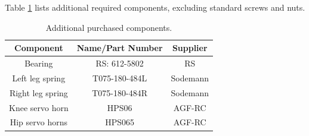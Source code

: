 Table \ref{tab:other_purchased_components} lists additional required components, excluding standard screws and nuts.

\begin{table}[h!]
    \centering
    \begin{tabular}{|c|c|c|}
        \hline
        Component & Name/Part Number & Supplier \\ \hline
        Bearing & RS: 612-5802 &  RS \\
        Left leg spring &  T075-180-484L & Sodemann\\
        Right leg spring &  T075-180-484R & Sodemann\\
        Knee servo horn & HPS06 & AGF-RC\\
        Hip servo horns & HPS065 & AGF-RC\\
        \hline
    \end{tabular}
    \caption{Additional purchased components.}
    \label{tab:other_purchased_components}  
\end{table}